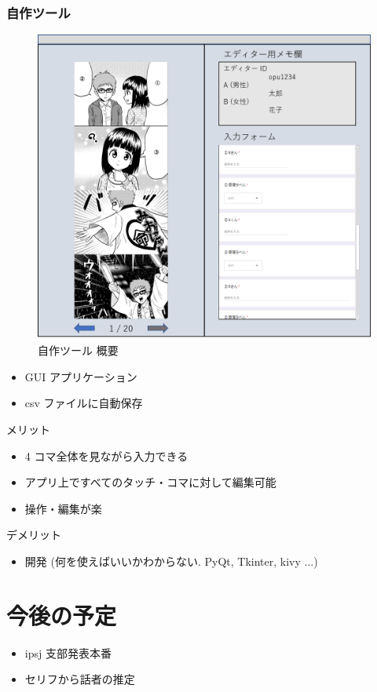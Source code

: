 \documentclass{jarticle}     %
\begin{document}
\subsubsection{自作ツール}

\begin{figure}[!tbh]
  \begin{center}
    \includegraphics[scale=0.7]{tool.png}
    \caption{自作ツール 概要} %
    \label{fig:tool} %
  \end{center}
\end{figure}

\begin{itemize}
  \item GUI アプリケーション
  \item csv ファイルに自動保存
\end{itemize}

メリット

\begin{itemize}
  \item 4 コマ全体を見ながら入力できる
  \item アプリ上ですべてのタッチ・コマに対して編集可能
  \item 操作・編集が楽
\end{itemize}

デメリット

\begin{itemize}
  \item 開発 (何を使えばいいかわからない. PyQt, Tkinter, kivy ...)
\end{itemize}

\section{今後の予定}
\begin{itemize}
  \item ipsj 支部発表本番
  \item セリフから話者の推定
\end{itemize}



\end{document}
